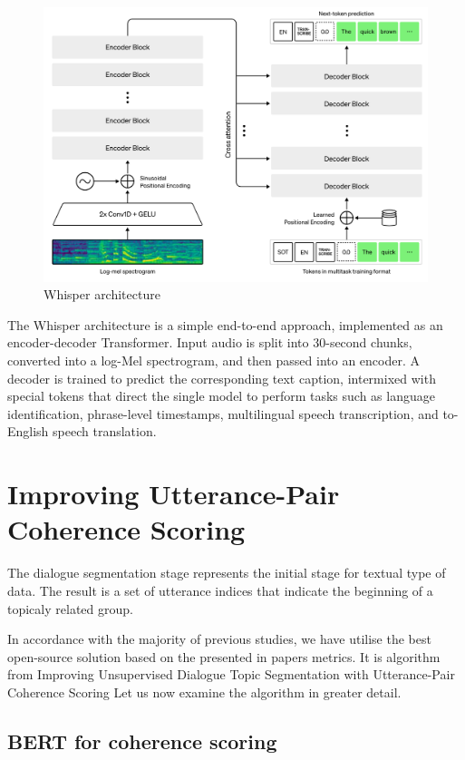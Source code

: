 \documentclass[PMI,VKR]{HSEUniversity}
\begin{document}
\begin{figure}[h]
    \centering
    \includegraphics[scale=0.7]{img/whisper.png}
    \caption{Whisper architecture}
\end{figure}

The Whisper architecture is a simple end-to-end approach, implemented as an encoder-decoder Transformer. 
Input audio is split into 30-second chunks, converted into a log-Mel spectrogram, and then passed into an encoder. 
A decoder is trained to predict the corresponding text caption, intermixed with special tokens that direct the single model to perform tasks such as language identification, phrase-level timestamps, multilingual speech transcription, and to-English speech translation.

\section{Improving Utterance-Pair Coherence Scoring}
\label{seg}

The dialogue segmentation stage represents the initial stage for textual type of data. 
The result is a set of utterance indices that indicate the beginning of a topicaly related group. 

In accordance with the majority of previous studies, we have utilise the best open-source solution based on the presented in papers metrics. 
It is algorithm from Improving Unsupervised Dialogue Topic Segmentation with Utterance-Pair Coherence Scoring \cite{depthscore:2021} 
Let us now examine the algorithm in greater detail. 

\subsection{BERT for coherence scoring}
\end{document}
